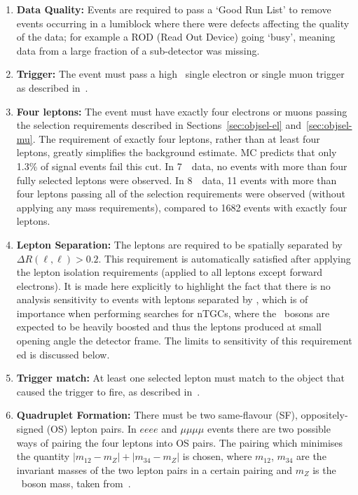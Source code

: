 \begin{enumerate}

    \item {\bf Data Quality:} Events are required to pass a `Good Run List' to
    remove events occurring in a lumiblock where there were defects affecting
    the quality of the data; for example a ROD (Read Out Device) going `busy',
    meaning data from a large fraction of a sub-detector was missing.

    \item {\bf Trigger:} The event must pass a high \pt\ single electron or single
    muon trigger as described in~.

    \item {\bf Four leptons:} The event must have exactly four electrons or
    muons passing the selection requirements described in
    Sections~\ref{sec:objsel-el} and~\ref{sec:objsel-mu}. The requirement of
    exactly four leptons, rather than at least four leptons, greatly simplifies
    the background estimate. MC predicts that only
    1.3\% of signal events fail this cut. 
    In 7~\tev\ data, no events with more
    than four fully selected leptons were observed.
    In 8~\tev\ data, 11 events with more than four leptons passing all of the
    selection requirements were observed (without applying any mass
    requirements), compared to 1682 events with exactly four leptons.

    \item {\bf Lepton Separation:} The leptons are required to be spatially
    separated by $\Delta{R}(\ell,\ell)>0.2$. This requirement is automatically
    satisfied after applying the lepton isolation requirements (applied to all
    leptons except forward electrons). It is made here explicitly 
    to highlight the fact that there is no analysis sensitivity to events with
    leptons separated by , which is of importance when performing
    searches for nTGCs, where the \Z\ bosons are expected to be heavily boosted
    and thus the leptons produced at small opening angle the detector frame.
    The limits to sensitivity of this requirement ed is discussed below.

    \item {\bf Trigger match:} At least one selected lepton must match to the
    object that caused the trigger to fire, as described in~. 

    \item {\bf Quadruplet Formation:} There must be two same-flavour (SF),
    oppositely-signed (OS) lepton pairs. In $eeee$ and $\mu\mu\mu\mu$ events there are
    two possible ways of pairing the four leptons into OS pairs. The pairing which
    minimises the quantity $|m_{12}-m_{Z}|+|m_{34}-m_{Z}|$ is chosen, where
    $m_{12}$, $m_{34}$ are the invariant masses of the two lepton pairs in a certain
    pairing and $m_Z$ is the \Z\ boson mass, taken from~\cite{PDG}.


\end{enumerate}
